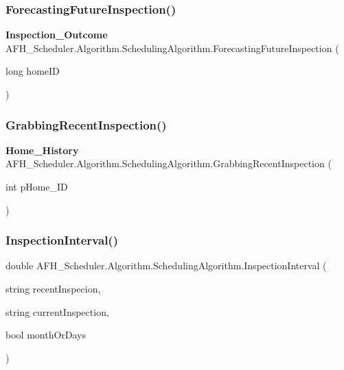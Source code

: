 \subsubsection{ForecastingFutureInspection()}
{\footnotesize\ttfamily \textbf{ Inspection\+\_\+\+Outcome} A\+F\+H\+\_\+\+Scheduler.\+Algorithm.\+Scheduling\+Algorithm.\+Forecasting\+Future\+Inspection (\begin{DoxyParamCaption}\item[{long}]{home\+ID }\end{DoxyParamCaption})}

\mbox{\label{class_a_f_h___scheduler_1_1_algorithm_1_1_scheduling_algorithm_a35a97d7813e8b62756642426d6d00f3c}} 
\subsubsection{GrabbingRecentInspection()}
{\footnotesize\ttfamily \textbf{ Home\+\_\+\+History} A\+F\+H\+\_\+\+Scheduler.\+Algorithm.\+Scheduling\+Algorithm.\+Grabbing\+Recent\+Inspection (\begin{DoxyParamCaption}\item[{int}]{p\+Home\+\_\+\+ID }\end{DoxyParamCaption})}

\mbox{\label{class_a_f_h___scheduler_1_1_algorithm_1_1_scheduling_algorithm_a08731157abc1d52ff09643386561ad9d}} 
\subsubsection{InspectionInterval()}
{\footnotesize\ttfamily double A\+F\+H\+\_\+\+Scheduler.\+Algorithm.\+Scheduling\+Algorithm.\+Inspection\+Interval (\begin{DoxyParamCaption}\item[{string}]{recent\+Inspecion,  }\item[{string}]{current\+Inspection,  }\item[{bool}]{month\+Or\+Days }\end{DoxyParamCaption})}

